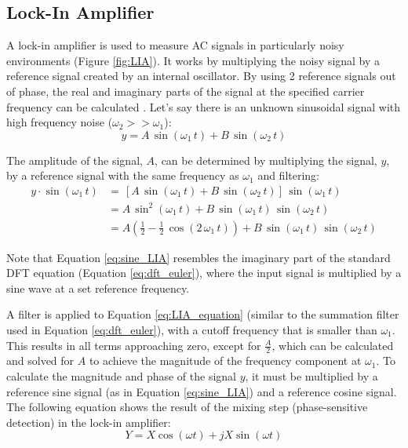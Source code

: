 \subsection{Lock-In Amplifier}

A lock-in amplifier is used to measure AC signals in particularly noisy environments (Figure \ref{fig:LIA}).  It works by multiplying the noisy signal by a reference signal created by an internal oscillator.  By using 2 reference signals out of phase, the real and imaginary parts of the signal at the specified carrier frequency can be calculated \cite{LIA_applications}.  Let's say there is an unknown sinusoidal signal with high frequency noise ($\omega_2 >> \omega_1$):
\begin{equation}
	y = A \,\sin{(\omega_1 \, t)} + B\,\sin{(\omega_2 \, t)}
\end{equation}

The amplitude of the signal, $A$, can be determined by multiplying the signal, $y$, by a reference signal with the same frequency as $\omega_1$ and filtering:
\begin{align}
	y \cdot \sin{(\omega_1 \, t)} &= \, \left[A \,\sin{(\omega_1 \, t)} + B\,\sin{(\omega_2 \, t)}\right] \, \sin{(\omega_1\,t)} \label{eq:sine_LIA}\\
	&=A\,\sin^2{(\omega_1\,t)} + B\,\sin{(\omega_1\,t)}\,\sin{(\omega_2\,t)} \\
	&=A\left(\frac{1}{2} - \frac{1}{2}\,\cos{(2\,\omega_1\,t)}\right) + B\,\sin{(\omega_1\,t)}\,\sin{(\omega_2\,t)} \label{eq:LIA_equation}
\end{align}

Note that Equation \ref{eq:sine_LIA} resembles the imaginary part of the standard DFT equation (Equation \ref{eq:dft_euler}), where the input signal is multiplied by a sine wave at a set reference frequency.

A filter is applied to Equation \ref{eq:LIA_equation} (similar to the summation filter used in Equation \ref{eq:dft_euler}), with a cutoff frequency that is smaller than $\omega_1$.  This results in all terms approaching zero, except for $\frac{A}{2}$, which can be calculated and solved for $A$ to achieve the magnitude of the frequency component at $\omega_1$.  To calculate the magnitude and phase of the signal $y$, it must be multiplied by a reference sine signal (as in Equation \ref{eq:sine_LIA}) and a reference cosine signal.  The following equation shows the result of the mixing step (phase-sensitive detection) in the lock-in amplifier:
\begin{equation} \label{eq:LIA_mixing}
	Y = X \cos{(\omega t)} + j X \sin{(\omega t)}
\end{equation}

